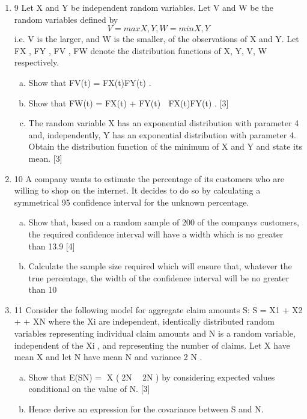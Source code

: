 \documentclass[a4paper,12pt]{article}
\begin{document}
\begin{enumerate}
\item 9 Let X and Y be independent random variables. Let V and W be the random variables
defined by
\[V = max {X, Y}, W = min {X, Y}\]
i.e. V is the larger, and W is the smaller, of the observations of X and Y.
Let FX , FY , FV , FW denote the distribution functions of X, Y, V, W respectively.
\begin{enumerate}[(a)]
\item Show that FV(t) = FX(t)FY(t) . 
\item Show that FW(t) = FX(t) + FY(t)  FX(t)FY(t) . [3]
\item The random variable X has an exponential distribution with parameter 4 and,
independently, Y has an exponential distribution with parameter 4. Obtain the
distribution function of the minimum of X and Y and state its mean. [3]
\end{enumerate}

\item 10 A company wants to estimate the percentage of its customers who are willing to shop
on the internet. It decides to do so by calculating a symmetrical 95%
confidence interval for the unknown percentage.
\begin{enumerate}[(a)]
\item Show that, based on a random sample of 200 of the companys customers, the
required confidence interval will have a width which is no greater than 13.9%
[4]
\item Calculate the sample size required which will ensure that, whatever the true
percentage, the width of the confidence interval will be no greater than 10%
\end{enumerate}
\item 11 Consider the following model for aggregate claim amounts S:
S = X1 + X2 + + XN
where the Xi are independent, identically distributed random variables representing
individual claim amounts and N is a random variable, independent of the Xi , and
representing the number of claims. Let X have mean X and let N have mean N and
variance 2
N .
\begin{enumerate}[(a)]
\item Show that
E(SN) = X (2N  2N )
by considering expected values conditional on the value of N. [3]
\item Hence derive an expression for the covariance between S and N. 
\end{enumerate}
\end{enumerate}
\end{document}
